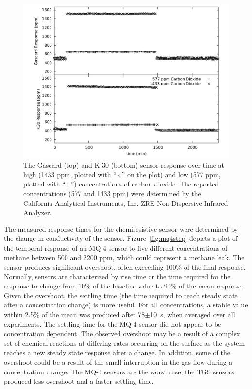 \documentclass[times]{joehreview}
\begin{document}
	\begin{figure}[!t]
		\centering
		\includegraphics[width=\columnwidth]{honey3.pdf}
		\caption{The Gascard (top) and K-30 (bottom) sensor response over time at high (1433 ppm, plotted with ``$\times$'' on the plot) and low (577 ppm, plotted with ``$+$'') concentrations of carbon dioxide.  The reported concentrations (577 and 1433 ppm) were determined by the California Analytical Instruments, Inc. ZRE Non-Dispersive Infrared Analyzer.}
		\label{fig:peakdetailco2}
	\end{figure}
	
	The measured response times for the chemiresistive sensor were determined by the change in conductivity of the sensor.  Figure~\ref{fig:mq4step} depicts a plot of the temporal response of an MQ-4 sensor to five different concentrations of methane between 500 and 2200 ppm, which could represent a methane leak. The sensor produces significant overshoot, often exceeding 100\% of the final response.  Normally, sensors are characterized by rise time or the time required for the response to change from 10\% of the baseline value to 90\% of the mean response.  Given the overshoot, the settling time (the time required to reach steady state after a concentration change) is more useful.  For all concentrations, a stable value within 2.5\% of the mean was produced after 78$\pm$\SI{10}{\second}, when averaged over all experiments.  The settling time for the MQ-4 sensor did not appear to be concentration dependent.  The observed overshoot may be a result of a complex set of chemical reactions at differing rates occurring on the surface as the system reaches a new steady state response after a change.  In addition, some of the overshoot could be a result of the small interruption in the gas flow during a concentration change. The MQ-4 sensors are the worst case, the TGS sensors produced less overshoot and a faster settling time.
	
\end{document}
